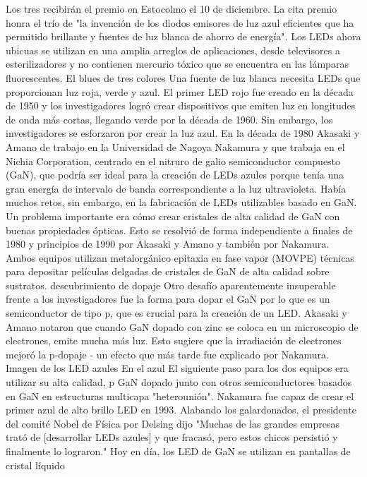  Los tres recibirán el premio en
Estocolmo el 10 de diciembre.  La cita premio honra el trío de "la
invención de los diodos emisores de luz azul eficientes que ha
permitido brillante y fuentes de luz blanca de ahorro de energía". Los
LEDs ahora ubicuas se utilizan en una amplia arreglos de aplicaciones,
desde televisores a esterilizadores y no contienen mercurio tóxico que
se encuentra en las lámparas fluorescentes.  El blues de tres colores
Una fuente de luz blanca necesita LEDs que proporcionan luz roja,
verde y azul. El primer LED rojo fue creado en la década de 1950 y los
investigadores logró crear dispositivos que emiten luz en longitudes
de onda más cortas, llegando verde por la década de 1960. Sin embargo,
los investigadores se esforzaron por crear la luz azul.  En la década
de 1980 Akasaki y Amano de trabajo en la Universidad de Nagoya
Nakamura y que trabaja en el Nichia Corporation, centrado en el
nitruro de galio semiconductor compuesto (GaN), que podría ser ideal
para la creación de LEDs azules porque tenía una gran energía de
intervalo de banda correspondiente a la luz ultravioleta.  Había
muchos retos, sin embargo, en la fabricación de LEDs utilizables
basado en GaN. Un problema importante era cómo crear cristales de alta
calidad de GaN con buenas propiedades ópticas. Esto se resolvió de
forma independiente a finales de 1980 y principios de 1990 por Akasaki
y Amano y también por Nakamura. Ambos equipos utilizan metalorgánico
epitaxia en fase vapor (MOVPE) técnicas para depositar películas
delgadas de cristales de GaN de alta calidad sobre sustratos.
descubrimiento de dopaje Otro desafío aparentemente insuperable frente
a los investigadores fue la forma para dopar el GaN por lo que es un
semiconductor de tipo p, que es crucial para la creación de un
LED. Akasaki y Amano notaron que cuando GaN dopado con zinc se coloca
en un microscopio de electrones, emite mucha más luz. Esto sugiere que
la irradiación de electrones mejoró la p-dopaje - un efecto que más
tarde fue explicado por Nakamura.  Imagen de los LED azules En el azul
El siguiente paso para los dos equipos era utilizar su alta calidad, p
GaN dopado junto con otros semiconductores basados en GaN en
estructuras multicapa "heterounión". Nakamura fue capaz de crear el
primer azul de alto brillo LED en 1993.  Alabando los galardonados, el
presidente del comité Nobel de Física por Delsing dijo "Muchas de las
grandes empresas trató de [desarrollar LEDs azules] y que fracasó,
pero estos chicos persistió y finalmente lo lograron."  Hoy en día,
los LED de GaN se utilizan en pantallas de cristal líquido
